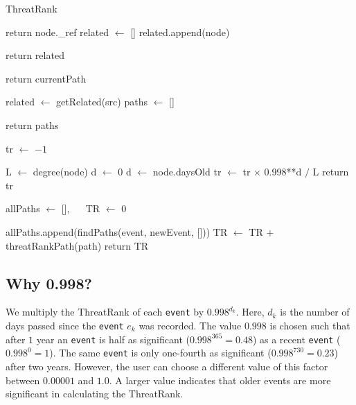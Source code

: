 \begin{algorithm}
    \caption{ThreatRank}
    \label{algo:threatrank}
    \DontPrintSemicolon
    \SetAlgoLined




     {
         {return node.\_ref}
        related $\gets$ []    \; %
         {
             {related.append(node)}
        }

        return related \;
    }

     {
         {return currentPath }

        related $\gets$ getRelated(src) \;
        paths $\gets$ [] \;

        return paths \;
    }


     {
        tr $\gets$ $-1$ \;

         {
            L $\gets$ degree(node) \;
            d $\gets$ 0 \;
             { d $\gets$ node.daysOld }
            tr $\gets$ tr $\times$ 0.998**d $/$ L \;
        }
    return tr \;
    }

     {
        allPaths $\gets$ [], ~~ TR $\gets$ 0 \;

         {
            allPaths.append(findPaths(event, newEvent, []))
        }
         {
            TR $\gets$ TR $+$ threatRankPath(path) \;
        }
        return TR \;
    }


\end{algorithm}



\subsection{Why 0.998?}

We multiply the ThreatRank of each \texttt{event} by $0.998^{d_k} $. Here, $d_k$ is the number of days passed since the \texttt{event} $e_k$ was recorded. The value $0.998$ is chosen such that after $1$ year an \texttt{event} is half as significant ($0.998^{365} = 0.48$) as a recent \texttt{event} ($0.998^0 = 1$). The same \texttt{event} is only one-fourth as significant ($0.998^{730} = 0.23$) after two years. However, the user can choose a different value of this factor between $0.00001$ and $1.0$. A larger value indicates that older events are more significant in calculating the ThreatRank.


